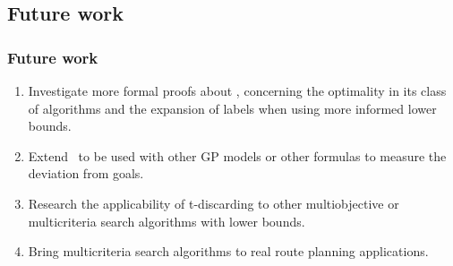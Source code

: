 \subsection{Future work}
\begin{frame} 
\frametitle{Future work}
	\begin{enumerate}
		\item Investigate more \textcolor{ao}{formal proofs about \lexgo}, concerning the optimality in its class of algorithms and the expansion of labels when using more informed lower bounds.
		\vspace{3mm}
		\item Extend \lexgo \ to be used with \textcolor{ao}{other GP models} or \textcolor{ao}{other formulas to measure the deviation} from goals. 
		\vspace{3mm}
		\item \textcolor{ao}{Research the applicability} of t-discarding to other multiobjective or multicriteria search algorithms with lower bounds.
		\vspace{3mm}
		\item Bring multicriteria search algorithms to \textcolor{ao}{real route planning applications.} 
	\end{enumerate}
\note{}
\end{frame}
